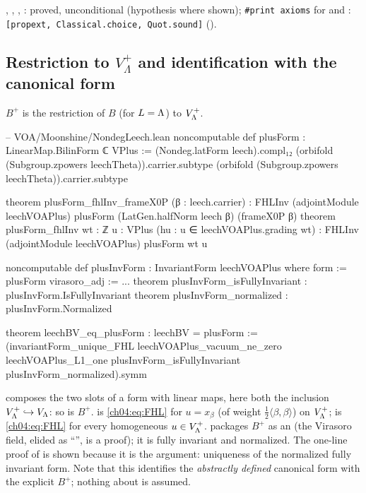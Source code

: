 \begin{status}
, , ,
: proved, unconditional (hypothesis  where shown);
\texttt{\#print axioms} for  and :
\texttt{[propext, Classical.choice, Quot.sound]} ().
\end{status}

\subsection{Restriction to \texorpdfstring{$V_\Lambda^+$}{V+} and identification with the canonical form}

\begin{definition}\label{ch04:def:plusform}
$B^+$ is the restriction of $B$ (for $L={\Lambda}$) to $V_{\Lambda}^+$.
\end{definition}

\begin{leancode}
-- VOA/Moonshine/NondegLeech.lean
noncomputable def plusForm : LinearMap.BilinForm ℂ VPlus :=
  (Nondeg.latForm leech).compl₁₂ (orbifold (Subgroup.zpowers leechTheta)).carrier.subtype
    (orbifold (Subgroup.zpowers leechTheta)).carrier.subtype

theorem plusForm_fhlInv_frameX0P (β : leech.carrier) :
    FHLInv (adjointModule leechVOAPlus) plusForm (LatGen.halfNorm leech β) (frameX0P β)
theorem plusForm_fhlInv {wt : ℤ} {u : VPlus} (hu : u ∈ leechVOAPlus.grading wt) :
    FHLInv (adjointModule leechVOAPlus) plusForm wt u

noncomputable def plusInvForm : InvariantForm leechVOAPlus where
  form := plusForm
  virasoro_adj := ...
theorem plusInvForm_isFullyInvariant : plusInvForm.IsFullyInvariant
theorem plusInvForm_normalized : plusInvForm.Normalized

theorem leechBV_eq_plusForm : leechBV = plusForm :=
  (invariantForm_unique_FHL leechVOAPlus_vacuum_ne_zero leechVOAPlus_L1_one
    plusInvForm_isFullyInvariant plusInvForm_normalized).symm
\end{leancode}

\begin{dictionary}
 composes the two slots of a form with linear maps, here both the inclusion
$V_{\Lambda}^+\hookrightarrow V_{\Lambda}$: so  is $B^+$. 
is \eqref{ch04:eq:FHL} for $u=x_\beta$ (of weight $\tfrac12\langle\beta,\beta\rangle$) on $V_{\Lambda}^+$;
 is \eqref{ch04:eq:FHL} for every homogeneous $u\in V_{\Lambda}^+$.
 packages $B^+$ as an  (the Virasoro field, elided as
``'', is a proof); it is fully invariant and normalized. The one-line proof of
 is shown because it is the argument: uniqueness of the normalized fully
invariant form. Note that this identifies the \emph{abstractly defined} canonical form 
with the explicit $B^+$; nothing about  is assumed.
\end{dictionary}


